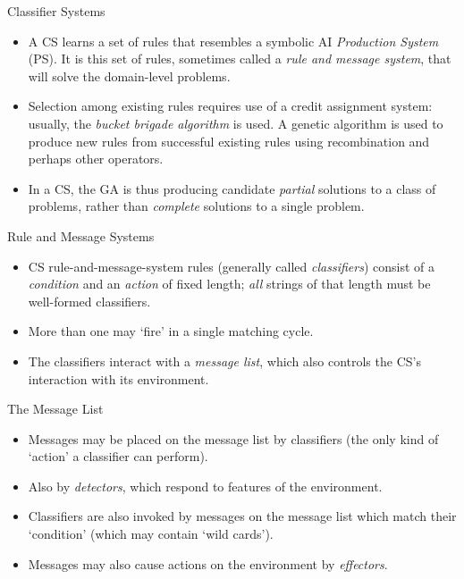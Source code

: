 \documentclass{article}
\begin{document}
\begin{slide}{}
{\Large Classifier Systems}
\begin{itemize}
\item A CS learns a set of rules that resembles a symbolic AI {\em Production
System} (PS). It is this set of rules, sometimes called a {\em rule and
message system}, that will solve the domain-level problems. 
\item Selection
among existing rules requires use of a {credit
assignment system}: usually, the {\em bucket brigade algorithm} is
used. A genetic 
algorithm is used to produce new rules from successful existing rules
using recombination and perhaps other operators.
\item In a CS, the GA is thus producing candidate {\em partial} solutions to
a class of problems, rather than
{\em complete} solutions to a single problem. 
\end{itemize}
\end{slide}

\begin{slide}{}
{\Large Rule and Message Systems}
\begin{itemize}
\item CS rule-and-message-system rules (generally called
{\em classifiers}) consist of a {\em condition} and
an {\em action} of fixed
length; {\em all} strings of that length must be well-formed
classifiers. 
\item More than one may `fire' in a single matching cycle.
\item The classifiers interact with a {\em message list}, which also
controls the CS's interaction with its environment.
\end{itemize}
\end{slide}

\begin{slide}{}
{\Large The Message List}
\begin{itemize}
\item Messages may be
placed on the message list by classifiers (the only
kind of `action' a classifier can perform).
\item Also by {\em detectors},
which respond to features of the environment. 
\item Classifiers are also
invoked by messages on the message list which match their `condition'
(which may contain `wild cards'). 
\item Messages may also cause actions
on the environment by {\em effectors}.
\end{itemize}
\end{slide}
\end{document}

